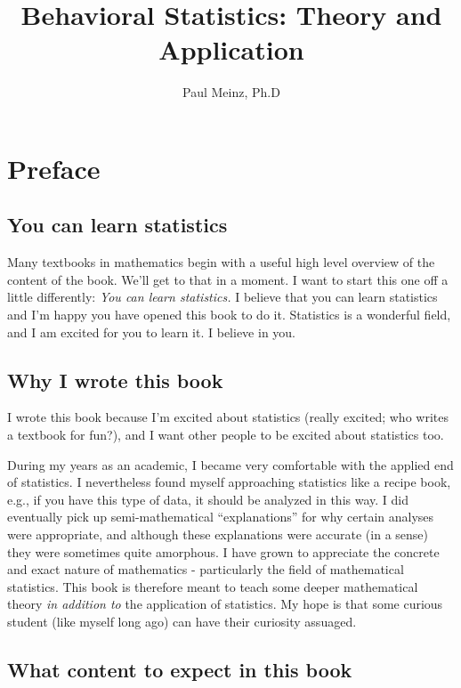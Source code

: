 \documentclass[
]{book}
\title{Behavioral Statistics: Theory and Application}
\author{Paul Meinz, Ph.D}
\date{}
\theoremstyle{definition}
\theoremstyle{definition}
\theoremstyle{definition}
\theoremstyle{definition}
\theoremstyle{remark}
\begin{document}
\maketitle

{
\setcounter{tocdepth}{1}
\tableofcontents
}
\chapter*{Preface}\label{preface}

\section{You can learn statistics}\label{you-can-learn-statistics}

Many textbooks in mathematics begin with a useful high level overview of the content of the book. We'll get to that in a moment. I want to start this one off a little differently: \emph{You can learn statistics.} I believe that you can learn statistics and I'm happy you have opened this book to do it. Statistics is a wonderful field, and I am excited for you to learn it. I believe in you.

\section{Why I wrote this book}\label{why-i-wrote-this-book}

I wrote this book because I'm excited about statistics (really excited; who writes a textbook for fun?), and I want other people to be excited about statistics too.

During my years as an academic, I became very comfortable with the applied end of statistics. I nevertheless found myself approaching statistics like a recipe book, e.g., if you have this type of data, it should be analyzed in this way. I did eventually pick up semi-mathematical ``explanations'' for why certain analyses were appropriate, and although these explanations were accurate (in a sense) they were sometimes quite amorphous. I have grown to appreciate the concrete and exact nature of mathematics - particularly the field of mathematical statistics. This book is therefore meant to teach some deeper mathematical theory \emph{in addition to} the application of statistics. My hope is that some curious student (like myself long ago) can have their curiosity assuaged.

\section{What content to expect in this book}\label{what-content-to-expect-in-this-book}
\end{document}

